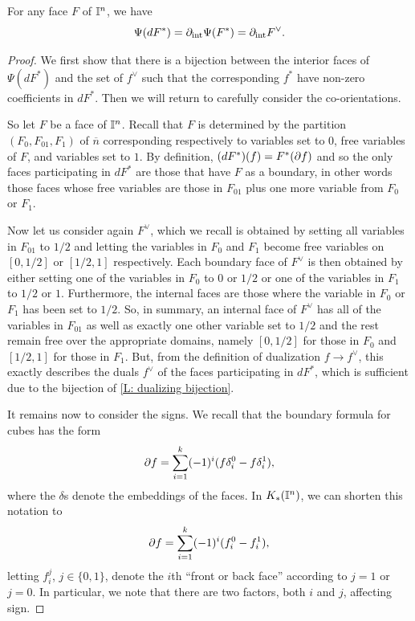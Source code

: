 \begin{lemma}\label{L: dualizing bijection}
For any face $F$ of $\mathbb{I}^n$, we have $$\Psi(d F^*)=\partial_{\text{int}}\Psi(F^*)=\partial_{\text{int}}F^\vee.$$
\end{lemma}
\begin{proof}
We first show that there is a bijection between the interior faces of $\Psi(d F^*)$ and the set of $f^\vee$ such that the corresponding $f^*$ have non-zero coefficients in $dF^*$. Then we will return to carefully consider the co-orientations.

So let $F$ be a face of $\mathbb{I}^n$. Recall that $F$ is determined by the partition $(F_0,F_{01}, F_1)$ of $\overline{n}$ corresponding respectively to variables set to $0$, free variables of $F$, and variables set to $1$. By definition, $(dF^*)(f)=F^*(\partial f)$ and so the only faces participating in $dF^*$ are those that have $F$ as a boundary, in other words those faces whose free variables are those in $F_{01}$ plus one more variable from $F_0$ or $F_1$.

Now let us consider again $F^\vee$, which we recall is obtained by setting all variables in $F_{01}$ to $1/2$ and letting the variables in $F_0$ and $F_1$ become free variables on $[0,1/2]$ or $[1/2,1]$ respectively. Each boundary face of $F^\vee$ is then obtained by either setting one of the variables in $F_0$ to $0$ or $1/2$ or one of the variables in $F_1$ to $1/2$ or $1$. Furthermore, the internal faces are those where the variable in $F_0$ or $F_1$ has been set to $1/2$. So, in summary, an internal face of $F^\vee$ has all of the variables in $F_{01}$ as well as exactly one other variable set to $1/2$ and the rest remain free over the appropriate domains, namely $[0,1/2]$ for those in $F_0$ and $[1/2,1]$ for those in $F_1$. But, from the definition of dualization $f\to f^\vee$, this exactly describes the duals $f^\vee$ of the faces participating in $dF^*$, which is sufficient due to the bijection of \cref{L: dualizing bijection}.

It remains now to consider the signs. We recall that the boundary formula for cubes has the form
$$\partial f=\sum_{i=1}^k (-1)^i(f \delta_i^0-f \delta^1_i),$$  where the $\delta$s denote the embeddings of the faces. In $K_*(\mathbb{I}^n)$, we can shorten this notation to $$\partial f=\sum_{i=1}^k (-1)^i(f_i^0-f^1_i),$$ letting $f_i^j$, $j\in \{0,1\}$, denote the $i$th ``front or back face'' according to $j=1$ or $j=0$. In particular, we note that there are two factors, both $i$ and $j$, affecting sign.


\end{proof}
